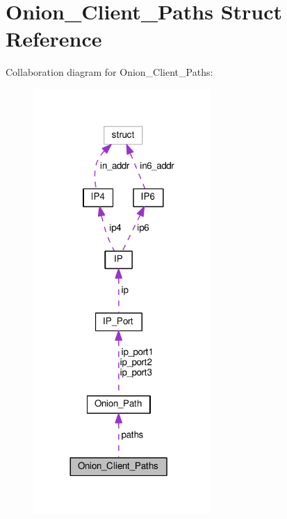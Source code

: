 \hypertarget{struct_onion___client___paths}{\section{Onion\+\_\+\+Client\+\_\+\+Paths Struct Reference}
\label{struct_onion___client___paths}
}


Collaboration diagram for Onion\+\_\+\+Client\+\_\+\+Paths\+:
\nopagebreak
\begin{figure}[H]
\begin{center}
\leavevmode
\includegraphics[width=192pt]{struct_onion___client___paths__coll__graph}
\end{center}
\end{figure}
